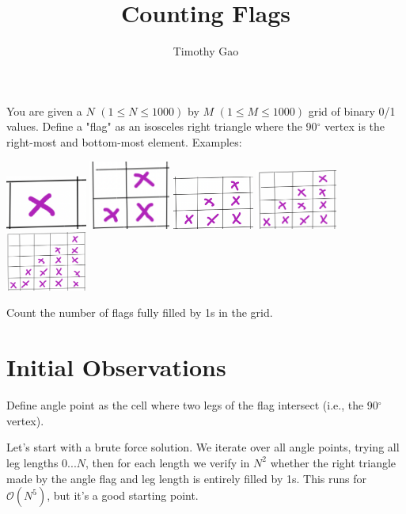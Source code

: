 \documentclass[15pt]{article}
\title{Counting Flags}
\author{Timothy Gao}
\date{}
\begin{document}
\maketitle

You are given a $N$ $(1 \leq N \leq 1000)$ by $M$ $(1 \leq M \leq 1000)$ grid of binary 0/1 values. Define a "flag" as an isosceles right triangle where the 90$^{\circ}$ vertex is the right-most and bottom-most element. Examples:

\includegraphics[width=0.2\textwidth]{1.png}
\includegraphics[width=0.2\textwidth]{2leg.png}
\includegraphics[width=0.2\textwidth]{3leg.png}
\includegraphics[width=0.2\textwidth]{4leg.png}
\includegraphics[width=0.2\textwidth]{5leg.png}

Count the number of flags fully filled by 1s in the grid.

\section{Initial Observations}

Define angle point as the cell where two legs of the flag intersect (i.e., the 90$^{\circ}$ vertex).

Let's start with a brute force solution. We iterate over all angle points, trying all leg lengths $0...N$, then for each length we verify in $N^2$ whether the right triangle made by the angle flag and leg length is entirely filled by 1s. This runs for $\mathcal{O}(N^5)$, but it's a good starting point.
\end{document}
